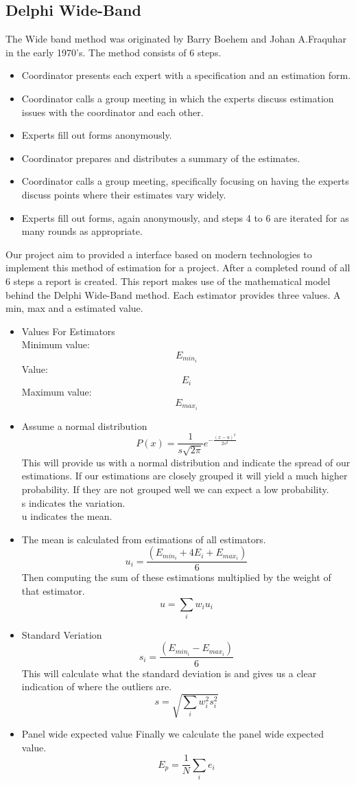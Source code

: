 \subsection{Delphi Wide-Band}
The Wide band method was originated by Barry Boehem and Johan A.Fraquhar in the early 1970's. The method consists of 6 steps.
\begin{itemize}
	\item{Coordinator presents each expert with a specification and an estimation form.}
	\item{Coordinator calls a group meeting in which the experts discuss estimation issues with the coordinator and each other.}
	\item{Experts fill out forms anonymously.}
	\item{Coordinator prepares and distributes a summary of the estimates.}
	\item{Coordinator calls a group meeting, specifically focusing on having the experts discuss points where their estimates vary widely.}
	\item{Experts fill out forms, again anonymously, and steps 4 to 6 are iterated for as many rounds as appropriate.}
\end{itemize}
Our project aim to provided a interface based on modern technologies to implement this method of estimation for a project. After a completed round of all 6 steps a report is created. This report makes use of the mathematical model behind the Delphi Wide-Band method. Each estimator provides three values. A min, max and a estimated value.
\begin{itemize}
	\item{Values For Estimators}
	\\Minimum value: \[E_{min_i}\]
	Value: \[E_i\]
	Maximum value: \[E_{max_i}\]
	\item{Assume a normal distribution}
	\[ P(x) = \frac{1}{s\sqrt{2\pi}}e^{-\frac{(x-u)^2}{2s^2}}\]
	This will provide us with a normal distribution and indicate the spread of our estimations. If our estimations are closely grouped it will yield a much higher probability. If they are not grouped well we can expect a low probability.
	\\s indicates the variation.
	\\u indicates the mean.
	\item{The mean}
	is calculated from estimations  of all estimators.
	\[ u_i = \frac{(E_{min_i}+4E_i+E_{max_i})}{6}\]
	Then computing the sum of these estimations multiplied by the weight of that estimator.
	\[ u = \sum_{i} w_iu_i\]
	\item{Standard Veriation}
	\[ s_i = \frac{(E_{min_i}-E_{max_i})}{6}\]
	This will calculate what the standard deviation is and gives us a clear indication of where the outliers are.
	\[ s = \sqrt{\sum_{i} w_i^2s_i^2}\]
	\item{Panel wide expected value}
	Finally we calculate the panel wide expected value.
	\[E_p = \frac{1}{N}\sum_{i}e_i\]
\end{itemize}
